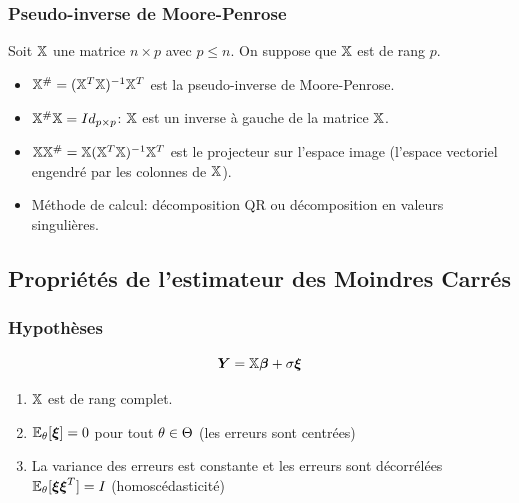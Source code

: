 \begin{frame}
\frametitle{Pseudo-inverse de Moore-Penrose}
Soit $\mathbb{X}$ une matrice $n \times p$ avec $ p \leq n$. On suppose que $\mathbb{X}$ est de rang $p$.
\begin{itemize}
\item $\mathbb{X}^{\#}= (\mathbb{X}^T \mathbb{X})^{-1} \mathbb{X}^T$ est la \alert{pseudo-inverse} de Moore-Penrose. 
\item $\mathbb{X}^{\#} \mathbb{X}= Id_{p \times p}$: $\mathbb{X}$ est un inverse à gauche de la matrice $\mathbb{X}$.
\item  $\mathbb{X} \mathbb{X}^{\#} = \mathbb{X} (\mathbb{X}^T \mathbb{X})^{-1} \mathbb{X}^T$ est le projecteur sur l'espace image (l'espace vectoriel engendré par les colonnes de $\mathbb{X}$).
\item Méthode de calcul: décomposition QR ou décomposition en valeurs singulières.
\end{itemize}
\end{frame}

\subsection{Propriétés de l'estimateur des Moindres Carrés}

\begin{frame}
\frametitle{Hypothèses}
\[
\operatorname{\boldsymbol{Y}}= \mathbb{X} \boldsymbol{\beta} + \sigma \boldsymbol{\xi}
\]
\begin{enumerate}
\item \alert<1>{$\mathbb{X}$ est de rang complet.}
\item \alert<2>{$\operatorname{{\mathbb E}}_\theta[\boldsymbol{\xi}]= 0$ pour tout $\theta \in \Theta$  (les erreurs sont centrées)}
\item \alert<3>{La variance des erreurs est constante et les erreurs sont décorrélées $\operatorname{{\mathbb E}}_{\theta}[\boldsymbol{\xi} \boldsymbol{\xi}^T] = I$ (homoscédasticité)}
\end{enumerate}
\end{frame}

